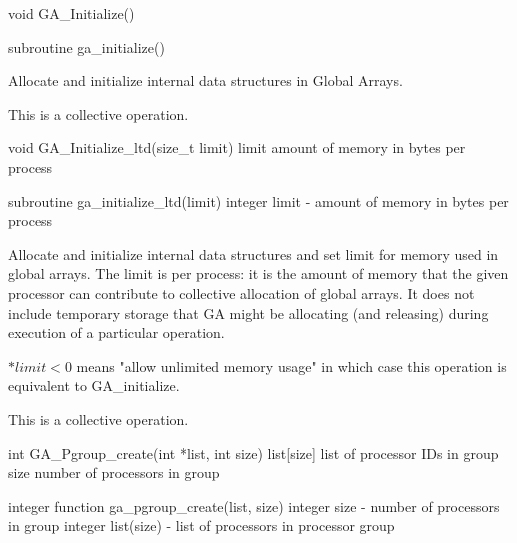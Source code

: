 \documentclass[12pt]{article}
\begin{document}

\begin{capi}
void GA_Initialize()
\end{capi}

\begin{fapi}
subroutine ga_initialize()
\end{fapi}

\begin{desc}

Allocate and initialize internal data structures in Global Arrays.

This is a collective operation.

\end{desc}


\begin{capi}
void GA_Initialize_ltd(size_t limit)
   limit      amount of memory in bytes per process            \access{[input]} 
\end{capi}

\begin{fapi}
subroutine ga_initialize_ltd(limit)
   integer limit  - amount of memory in bytes per process      \access{[input]} 
\end{fapi}

\begin{desc}

  Allocate and initialize internal data structures and set limit for
  memory used in global arrays. The limit is per process: it is the
  amount of memory that the given processor can contribute to
  collective allocation of global arrays. It does not include
  temporary storage that GA might be allocating (and releasing) during
  execution of a particular operation.

  $*limit < 0$ means "allow unlimited memory usage" in which case this
  operation is equivalent to GA_initialize.

This is a collective operation.

\end{desc}


\begin{capi}
int GA_Pgroup_create(int *list, int size)
   list[size]                     list of processor IDs in group   \access{[input]} 
   size                           number of processors in group    \access{[input]} 
\end{capi}

\begin{fapi}
integer function ga_pgroup_create(list, size)
   integer       size              - number of processors in group    \access{[input]} 
   integer       list(size)        - list of processors in processor
                                 group                                \access{[input]} 
\end{fapi}
\end{document}
